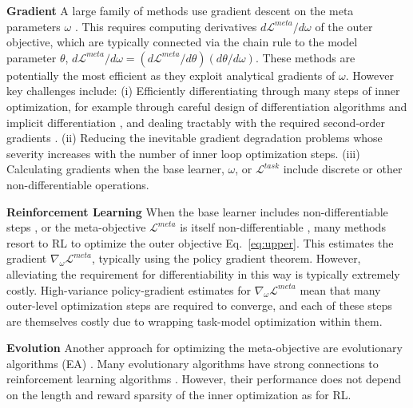 \documentclass[10pt,journal,compsoc]{IEEEtran}
\newcommand{\keypoint}[1]{\vspace{0.1cm}\noindent\textbf{#1}\quad}
\begin{document}
\keypoint{Gradient} A large family of methods use gradient descent on the meta parameters $\omega$ \cite{finn2017maml,ravi2016optimization,franceschi2017hyperopt,li2019featurecritic}. This requires computing derivatives $d\mathcal{L}^{meta}/d\omega$ of the outer objective, which are typically connected via the chain rule to the model parameter $\theta$, $d\mathcal{L}^{meta}/d\omega=(d\mathcal{L}^{meta}/d\theta) (d\theta/d\omega)$. These methods are potentially the most efficient as they exploit analytical gradients of $\omega$. However key challenges include: (i) Efficiently differentiating through many steps of inner optimization, for example through careful design of differentiation algorithms \cite{franceschi2018bilevel,maclaurin2015gradienthyper, micaelli2020nongreedy} and implicit differentiation \cite{rajeswaran2019metaimplicit,russell2019fixingimplicit,lorraine2019optmillionsofhyperparams}, and dealing tractably with the required second-order gradients \cite{nichol2018reptilefoml}. (ii) Reducing the inevitable gradient degradation problems whose severity increases with the number of inner loop optimization steps. (iii) Calculating gradients when the base learner, $\omega$, or $\mathcal{L}^{task}$ include discrete or other non-differentiable operations. 


\keypoint{Reinforcement Learning} When the base learner includes non-differentiable steps \cite{cubuk2019autoaug}, or the meta-objective $\mathcal{L}^{meta}$ is itself non-differentiable \cite{huang2019lossmetric}, many methods \cite{duan2016fastslowrl} resort to RL to optimize the outer objective Eq.~\ref{eq:upper}. This estimates the gradient $\nabla_\omega\mathcal{L}^{meta}$, typically using the policy gradient theorem. However, alleviating the requirement for differentiability in this way is typically extremely costly. High-variance policy-gradient estimates for $\nabla_\omega\mathcal{L}^{meta}$ mean that many outer-level optimization steps are required to converge, and each of these steps are themselves costly due to wrapping task-model optimization within them.

\keypoint{Evolution} Another approach for optimizing the meta-objective are evolutionary algorithms (EA) \cite{schmidhuber1987evolutionary,salimans2017evolution,stanley2019designing}. Many evolutionary algorithms have strong connections to reinforcement learning algorithms \cite{stulp2013rles}. However, their performance does not depend on the length and reward sparsity of the inner optimization as for RL.
\end{document}
